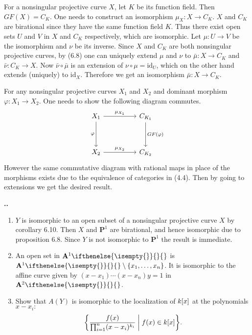 \documentclass{note}
\makeatletter
\newcounter{exercise}[section]
\newcommand\Ex{
    \if@noskipsec \leavevmode \fi
    \par
    \refstepcounter{exercise}
    \textbf{\thesection.\arabic{exercise}.}
}
\newcommand{\Affine}[2][]{\mathbf{A}^{#2}\ifthenelse{\isempty{#1}}{}{_{#1}}}
\newcommand{\Proj}[1]{\mathbf{P}^{#1}}
\newcommand{\id}{\mathrm{id}}
\makeatother
\begin{document}
For a nonsingular projective curve $X$, let $K$ be its function field. Then
$GF(X) = C_K$. One needs to construct an isomorphism $\mu_X\colon X\to C_K$.
$X$ and $C_K$ are birational since they have the same function field $K$. Thus
there exist open sets $U$ and $V$ in $X$ and $C_K$ respectively, which are
isomorphic. Let $\mu\colon U\to V$ be the isomorphism and $\nu$ be its inverse.
Since $X$ and $C_K$ are both nonsingular projective curves, by (6.8) one can
uniquely extend $\mu$ and $\nu$ to $\bar\mu\colon X\to C_K$ and $\bar\nu\colon
  C_K\to X$. Now $\bar\nu\circ\bar\mu$ is an extension of $\nu\circ\mu = \id_U$,
which on the other hand extends (uniquely) to $\id_X$. Therefore we get an
isomorphism $\bar\mu\colon X\to C_K$.

For any nonsingular projective curves $X_1$ and $X_2$ and dominant morphism
$\varphi\colon X_1\to X_2$. One needs to show the following diagram commutes.
\begin{equation*}
  \begin{tikzcd}[row sep=huge,column sep=huge]
    X_1 \arrow{r}{\mu_{X_1}} \arrow[swap]{d}{\varphi} & C_{K_1}
    \arrow{d}{GF(\varphi)} \\ X_2 \arrow{r}{\mu_{X_2}} & C_{K_2}
  \end{tikzcd}
\end{equation*}
However the same commutative diagram with rational maps in place of the
morphisms exists due to the equivalence of categories in (4.4). Then by going
to extensions we get the desired result.


\Ex
\begin{enumerate}
  \item $Y$ is isomorphic to an open subset of a nonsingular projective
        curve $X$ by corollary 6.10. Then $X$ and $\Proj1$ are birational, and hence
        isomorphic due to proposition 6.8. Since $Y$ is not isomorphic to $\Proj1$ the
        result is immediate.
  \item An open set in $\Affine1$ is $\Affine1\setminus\set{x_1}{\dots}{x_n}$. It is
        isomorphic to the affine curve given by $(x-x_1)\cdots(x-x_n)y=1$ in
        $\Affine2$.
  \item Show that $A(Y)$ is isomorphic to the localization of $\polynomials{k}{x}$ at
        the polynomials $x-x_i\colon$
        \begin{equation*}
          \set{\frac{f(x)}{\prod_{i=1}^n(x-x_i)^{k_i}} \biggm\vert
            f(x) \in \polynomials{k}{x}}.
        \end{equation*}
\end{enumerate}
\end{document}
